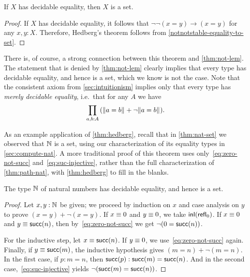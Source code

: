 \begin{thm}[Hedberg]\label{thm:hedberg}
  If $X$ has decidable equality, then $X$ is a set.
\end{thm}

\begin{proof}
If $X$ has decidable equality, it follows that $\neg\neg(x=y)\to(x=y)$ for any
$x,y:X$. Therefore, Hedberg's theorem follows from
\cref{notnotstable-equality-to-set}.
\end{proof}

There is, of course, a strong connection between this theorem and \cref{thm:not-lem}.
The statement \LEM{\infty} that is denied by \cref{thm:not-lem} clearly implies that every type has decidable equality, and hence is a set, which we know is not the case.
%
Note that the consistent axiom \LEM{} from \cref{sec:intuitionism} implies only that every type has \emph{merely decidable equality}, i.e.\ that for any $A$ we have
%
%
\[ \prd{a,b:A} (\brck{a=b} + \neg\brck{a=b}). \]

%

As an example application of \cref{thm:hedberg}, recall that in \cref{thm:nat-set} we observed that $\mathbb{N}$ is a set, using our characterization of its equality types in
\cref{sec:compute-nat}.
A more traditional proof of this theorem uses only~\eqref{eq:zero-not-succ} and~\eqref{eq:suc-injective}, rather than the full
characterization of \cref{thm:path-nat}, with \cref{thm:hedberg} to fill in the blanks.

\begin{thm}\label{prop:nat-is-set}
 The type $\mathbb{N}$ of natural numbers has decidable equality, and hence is a set.
\end{thm}

\begin{proof}
  Let $x, y : \mathbb{N}$ be given; we proceed by induction on $x$ and case analysis on $y$ to prove $(x=y)+\neg(x=y)$.
  If $x \equiv 0$ and $y \equiv 0$, we take ${\mathsf{inl}}(\mathsf{refl}_{0})$.
  If $x \equiv 0$ and $y \equiv \mathsf{succ}(n)$, then by~\eqref{eq:zero-not-succ} we get $\neg (0 = \mathsf{succ} (n))$.

  For the inductive step, let $x \equiv \mathsf{succ} (n)$.
  If $y \equiv 0$, we use~\eqref{eq:zero-not-succ} again.
  Finally, if $y \equiv \mathsf{succ} (m)$, the inductive hypothesis gives $(m = n)+\neg(m = n)$.
  In the first case, if $p:m=n$, then ${\mathsf{succ}}\mathopen{}\left({p}\right)\mathclose{}:\mathsf{succ}(m)=\mathsf{succ}(n)$.
  And in the second case,~\eqref{eq:suc-injective} yields $\neg(\mathsf{succ}(m)=\mathsf{succ}(n))$.
\end{proof}

